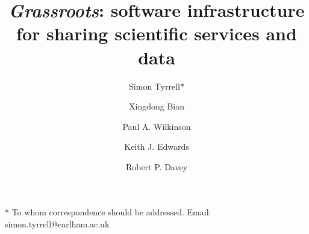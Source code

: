 \documentclass[9pt,a4paper]{extarticle}
\begin{document}
\pagestyle{front}

\title{\textit {Grassroots}: software infrastructure for sharing scientific services and data}
\author[1]{Simon Tyrrell*}
\author[1]{Xingdong Bian}
\author[2]{Paul A. Wilkinson}
\author[2]{Keith J. Edwards}
\author[1]{Robert P. Davey}

\maketitle

* To whom correspondence should be addressed. Email: simon.tyrrell@earlham.ac.uk

\thispagestyle{front}

\end{document}

